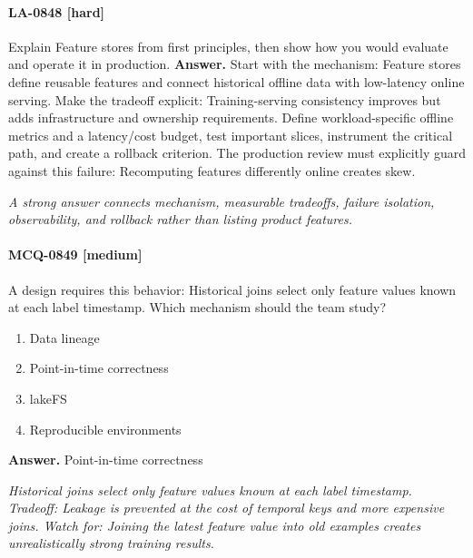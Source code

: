 \paragraph{LA-0848 [hard]} Explain Feature stores from first principles, then show how you would evaluate and operate it in production.
\noindent\textbf{Answer.} Start with the mechanism: Feature stores define reusable features and connect historical offline data with low-latency online serving. Make the tradeoff explicit: Training-serving consistency improves but adds infrastructure and ownership requirements. Define workload-specific offline metrics and a latency/cost budget, test important slices, instrument the critical path, and create a rollback criterion. The production review must explicitly guard against this failure: Recomputing features differently online creates skew.
\par\textit{A strong answer connects mechanism, measurable tradeoffs, failure isolation, observability, and rollback rather than listing product features.}
\paragraph{MCQ-0849 [medium]} A design requires this behavior: Historical joins select only feature values known at each label timestamp. Which mechanism should the team study?
\begin{enumerate}[label=\Alph*.]
\item Data lineage
\item Point-in-time correctness
\item lakeFS
\item Reproducible environments
\end{enumerate}
\noindent\textbf{Answer.} Point-in-time correctness
\par\textit{Historical joins select only feature values known at each label timestamp. Tradeoff: Leakage is prevented at the cost of temporal keys and more expensive joins. Watch for: Joining the latest feature value into old examples creates unrealistically strong training results.}
